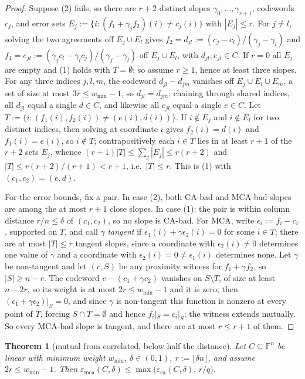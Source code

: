 \documentclass[11pt]{amsart}
\newtheorem{theorem}{Theorem}[section]
\theoremstyle{definition}
\theoremstyle{remark}
\newcommand{\F}{\mathbb{F}}
\newcommand{\eca}{\varepsilon_{\mathrm{ca}}}
\newcommand{\emca}{\varepsilon_{\mathrm{mca}}}
\begin{document}
\begin{proof}
Suppose (2) fails, so there are $r+2$ distinct slopes $\gamma_0,\dots,\gamma_{r+1}$, codewords $c_j$, and error sets $E_j:=\{i:(f_1+\gamma_jf_2)(i)\ne c_j(i)\}$ with $|E_j|\le r$. For $j\ne l$, solving the two agreements off $E_j\cup E_l$ gives $f_2=d_{jl}:=(c_j-c_l)/(\gamma_j-\gamma_l)$ and $f_1=e_{jl}:=(\gamma_jc_l-\gamma_lc_j)/(\gamma_j-\gamma_l)$ off $E_j\cup E_l$, with $d_{jl},e_{jl}\in C$. If $r=0$ all $E_j$ are empty and (1) holds with $T=\emptyset$; so assume $r\ge1$, hence at least three slopes. For any three indices $j,l,m$, the codeword $d_{jl}-d_{jm}$ vanishes off $E_j\cup E_l\cup E_m$, a set of size at most $3r\le w_{\min}-1$, so $d_{jl}=d_{jm}$; chaining through shared indices, all $d_{jl}$ equal a single $d\in C$, and likewise all $e_{jl}$ equal a single $e\in C$. Let $T:=\{i:(f_1(i),f_2(i))\ne(e(i),d(i))\}$. If $i\notin E_j$ and $i\notin E_l$ for two distinct indices, then solving at coordinate $i$ gives $f_2(i)=d(i)$ and $f_1(i)=e(i)$, so $i\notin T$; contrapositively each $i\in T$ lies in at least $r+1$ of the $r+2$ sets $E_j$, whence $(r+1)|T|\le\sum_j|E_j|\le r(r+2)$ and $|T|\le r(r+2)/(r+1)<r+1$, i.e.\ $|T|\le r$. This is (1) with $(c_1,c_2)=(e,d)$.

For the error bounds, fix a pair. In case (2), both CA-bad and MCA-bad slopes are among the at most $r+1$ close slopes. In case (1): the pair is within column distance $r/n\le\delta$ of $(c_1,c_2)$, so no slope is CA-bad. For MCA, write $\epsilon_i:=f_i-c_i$, supported on $T$, and call $\gamma$ \emph{tangent} if $\epsilon_1(i)+\gamma\epsilon_2(i)=0$ for some $i\in T$; there are at most $|T|\le r$ tangent slopes, since a coordinate with $\epsilon_2(i)\ne0$ determines one value of $\gamma$ and a coordinate with $\epsilon_2(i)=0\ne\epsilon_1(i)$ determines none. Let $\gamma$ be non-tangent and let $(c,S)$ be any proximity witness for $f_1+\gamma f_2$, so $|S|\ge n-r$. The codeword $c-(c_1+\gamma c_2)$ vanishes on $S\setminus T$, of size at least $n-2r$, so its weight is at most $2r\le w_{\min}-1$ and it is zero; then $(\epsilon_1+\gamma\epsilon_2)|_S=0$, and since $\gamma$ is non-tangent this function is nonzero at every point of $T$, forcing $S\cap T=\emptyset$ and hence $f_i|_S=c_i|_S$: the witness extends mutually. So every MCA-bad slope is tangent, and there are at most $r\le r+1$ of them.
\end{proof}

\begin{theorem}[mutual from correlated, below half the distance]\label{thm:half}
Let $C\subseteq\F^n$ be linear with minimum weight $w_{\min}$, $\delta\in(0,1)$, $r:=\lfloor\delta n\rfloor$, and assume $2r\le w_{\min}-1$. Then $\emca(C,\delta)\le\max\bigl(\eca(C,\delta),\,r/q\bigr)$.
\end{theorem}
\end{document}

